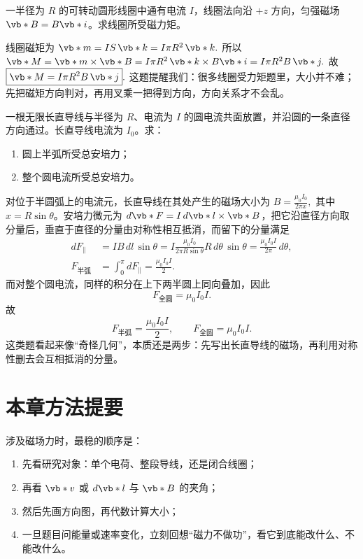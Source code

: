\documentclass[lang=cn,11pt]{elegantbook}
\begin{document}
\begin{exercise}[圆形线圈在指定坐标系中的磁力矩方向]
一半径为 \(R\) 的可转动圆形线圈中通有电流 \(I\)，线圈法向沿 \(+z\) 方向，匀强磁场 \(\vb*{B}=B\vb*{i}\)。求线圈所受磁力矩。
\end{exercise}

\begin{solution}
线圈磁矩为
 \(\vb*{m}=IS\,\vb*{k}=I\pi R^2\,\vb*{k}.\) 
所以
 \(\vb*{M}=\vb*{m}\times \vb*{B} =I\pi R^2\,\vb*{k}\times B\vb*{i} =I\pi R^2B\,\vb*{j}.\) 
故
 \(\boxed{\vb*{M}=I\pi R^2B\,\vb*{j}}.\) 
这题提醒我们：很多线圈受力矩题里，大小并不难；先把磁矩方向判对，再用叉乘一把得到方向，方向关系才不会乱。
\end{solution}

\begin{exercise}[圆电流与共面长直导线间的安培力]
一根无限长直导线与半径为 \(R\)、电流为 \(I\) 的圆电流共面放置，并沿圆的一条直径方向通过。长直导线电流为 \(I_0\)。求：
\begin{enumerate}
 \item 圆上半弧所受总安培力；
 \item 整个圆电流所受总安培力。
\end{enumerate}
\end{exercise}

\begin{solution}
对位于半圆弧上的电流元，长直导线在其处产生的磁场大小为
 \(B=\frac{\mu_0 I_0}{2\pi x},\) 
其中 \(x=R\sin\theta\)。安培力微元为 \(d\vb*{F}=I\,d\vb*{l}\times\vb*{B}\)，把它沿直径方向取分量后，垂直于直径的分量由对称性相互抵消，而留下的分量满足
\[
\begin{aligned}
dF_{\parallel}
&=IB\,dl\,\sin\theta
=I\frac{\mu_0I_0}{2\pi R\sin\theta}R\,d\theta\,\sin\theta
=\frac{\mu_0I_0I}{2\pi}\,d\theta,\\
F_{\text{半弧}}
&=\int_0^\pi dF_{\parallel}
=\frac{\mu_0 I_0 I}{2}.
\end{aligned}
\]
而对整个圆电流，同样的积分在上下两半圆上同向叠加，因此
\[
F_{\text{全圆}}=\mu_0 I_0 I.
\]
故
\[
\boxed{
F_{\text{半弧}}=\frac{\mu_0 I_0 I}{2},
\qquad
F_{\text{全圆}}=\mu_0 I_0 I.
}
\]
这类题看起来像“奇怪几何”，本质还是两步：先写出长直导线的磁场，再利用对称性删去会互相抵消的分量。
\end{solution}

\section{本章方法提要}

涉及磁场力时，最稳的顺序是：
\begin{enumerate}
 \item 先看研究对象：单个电荷、整段导线，还是闭合线圈；
 \item 再看 \(\vb*{v}\) 或 \(d\vb*{l}\) 与 \(\vb*{B}\) 的夹角；
 \item 然后先画方向图，再代数计算大小；
 \item 一旦题目问能量或速率变化，立刻回想“磁力不做功”，看它到底能改什么、不能改什么。
\end{enumerate}
\end{document}
